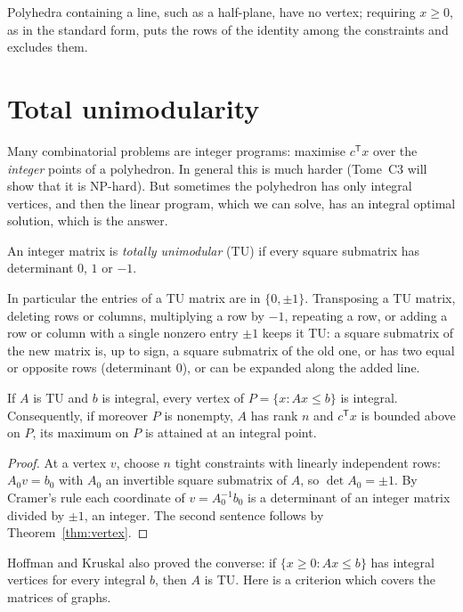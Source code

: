 Polyhedra containing a line, such as a half-plane, have no vertex; requiring $x\ge0$, as in the standard form, puts the rows of the identity among the constraints and excludes them.

\section{Total unimodularity}\label{sec:tu}

Many combinatorial problems are integer programs: maximise $c^{\mathsf T}x$ over the \emph{integer} points of a polyhedron. In general this is much harder (Tome~C3 will show that it is NP-hard). But sometimes the
polyhedron has only integral vertices, and then the linear program, which we can solve, has an integral optimal solution, which is the answer.

\begin{definition}
An integer matrix is \emph{totally unimodular} (TU) if every square submatrix has determinant $0$, $1$ or $-1$.
\end{definition}

In particular the entries of a TU matrix are in $\{0,\pm1\}$. Transposing a TU matrix, deleting rows or columns, multiplying a row by $-1$, repeating a row, or adding a row or column with a single nonzero entry $\pm1$
keeps it TU: a square submatrix of the new matrix is, up to sign, a square submatrix of the old one, or has two equal or opposite rows (determinant $0$), or can be expanded along the added line.

\begin{theorem}\label{thm:hoffmankruskal}
If $A$ is TU and $b$ is integral, every vertex of $P=\{x:Ax\le b\}$ is integral. Consequently, if moreover $P$ is nonempty, $A$ has rank $n$ and $c^{\mathsf T}x$ is bounded above on $P$, its maximum on $P$ is attained at
an integral point.
\end{theorem}
\begin{proof}
At a vertex $v$, choose $n$ tight constraints with linearly independent rows: $A_0v=b_0$ with $A_0$ an invertible square submatrix of $A$, so $\det A_0=\pm1$. By Cramer's rule each coordinate of $v=A_0^{-1}b_0$ is a determinant of an integer
matrix divided by $\pm1$, an integer. The second sentence follows by Theorem~\ref{thm:vertex}.
\end{proof}

Hoffman and Kruskal also proved the converse: if $\{x\ge0:Ax\le b\}$ has integral vertices for every integral $b$, then $A$ is TU. Here is a criterion which covers the matrices of graphs.

